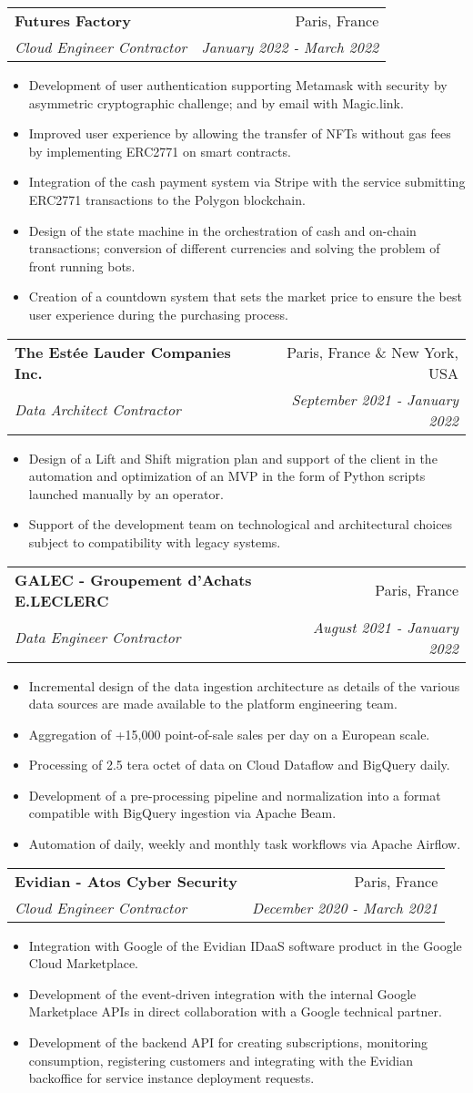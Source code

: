 \documentclass[letterpaper,11pt]{article}
\makeatletter
\newcommand{\resumeItem}[1]{
  \item\small{#1 \vspace{-2pt}}
}
\newcommand{\resumeSubheading}[4]{
  \vspace{-1pt}\item
    \begin{tabular*}{0.97\textwidth}[t]{l@{\extracolsep{\fill}}r}
      \textbf{#1} & #2 \\
      \textit{\small#3} & \textit{\small #4} \\
    \end{tabular*}\vspace{-5pt}
}
\newcommand{\resumeItemListStart}{\begin{itemize}}
\newcommand{\resumeItemListEnd}{\end{itemize}\vspace{-5pt}}
\makeatother
\begin{document}
\resumeSubheading{Futures Factory}
{Paris, France}
{Cloud Engineer Contractor}
{January 2022 - March 2022}
\resumeItemListStart{}
\resumeItem{
  Development of user authentication supporting Metamask with security by
  asymmetric cryptographic challenge; and by email with Magic.link.
}
\resumeItem{
  Improved user experience by allowing the transfer of NFTs without gas fees by
  implementing ERC2771 on smart contracts.
}
\resumeItem{
  Integration of the cash payment system via Stripe with the service submitting
  ERC2771 transactions to the Polygon blockchain.
}
\resumeItem{
  Design of the state machine in the orchestration of cash and on-chain
  transactions; conversion of different currencies and solving the problem of
  front running bots.
}
\resumeItem{
  Creation of a countdown system that sets the market price to ensure the best
  user experience during the purchasing process.
}
\resumeItemListEnd{}

\resumeSubheading{The Estée Lauder Companies Inc.}
{Paris, France \& New York, USA}
{Data Architect Contractor}
{September 2021 - January 2022}
\resumeItemListStart{}
\resumeItem{
  Design of a Lift and Shift migration plan and support of the client in the
  automation and optimization of an MVP in the form of Python scripts launched
  manually by an operator.
}
\resumeItem{
  Support of the development team on technological and architectural choices
  subject to compatibility with legacy systems.
}
\resumeItemListEnd{}

\resumeSubheading{GALEC - Groupement d'Achats E.LECLERC}
{Paris, France}
{Data Engineer Contractor}
{August 2021 - January 2022}
\resumeItemListStart{}
\resumeItem{
  Incremental design of the data ingestion architecture as details of the various
  data sources are made available to the platform engineering team.
}
\resumeItem{
  Aggregation of +15,000 point-of-sale sales per day on a European scale.
}
\resumeItem{
  Processing of 2.5 tera octet of data on Cloud Dataflow and BigQuery daily.
}
\resumeItem{
  Development of a pre-processing pipeline and normalization into a format
  compatible with BigQuery ingestion via Apache Beam.
}
\resumeItem{
  Automation of daily, weekly and monthly task workflows via Apache Airflow.
}
\resumeItemListEnd{}

\resumeSubheading{Evidian - Atos Cyber Security}
{Paris, France}
{Cloud Engineer Contractor}
{December 2020 - March 2021}
\resumeItemListStart{}
\resumeItem{
  Integration with Google of the Evidian IDaaS software product in the Google
  Cloud Marketplace.
}
\resumeItem{
  Development of the event-driven integration with the internal Google Marketplace
  APIs in direct collaboration with a Google technical partner.
}
\resumeItem{
  Development of the backend API for creating subscriptions, monitoring
  consumption, registering customers and integrating with the Evidian backoffice
  for service instance deployment requests.
}
\resumeItemListEnd{}
\end{document}
